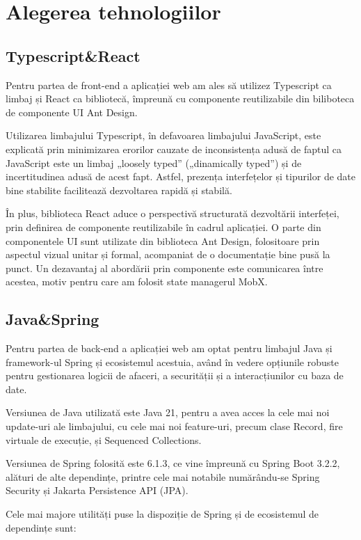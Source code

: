 \section{Alegerea tehnologiilor}

\subsection{Typescript\&React}

Pentru partea de front-end a aplicației web am ales să utilizez Typescript ca limbaj și React ca bibliotecă, împreună cu componente reutilizabile din biliboteca de componente UI Ant Design.

Utilizarea limbajului Typescript, în defavoarea limbajului JavaScript, este explicată prin minimizarea erorilor cauzate de inconsistența adusă de faptul ca JavaScript este un limbaj „loosely typed” („dinamically typed”) și de incertitudinea adusă de acest fapt. Astfel, prezența interfețelor și tipurilor de date bine stabilite facilitează dezvoltarea rapidă și stabilă.

În plus, biblioteca React aduce o perspectivă structurată dezvoltării interfeței, prin definirea de componente reutilizabile în cadrul aplicației. O parte din componentele UI sunt utilizate din biblioteca Ant Design, folositoare prin aspectul vizual unitar și formal, acompaniat de o documentație bine pusă la punct. Un dezavantaj al abordării prin componente este comunicarea între acestea, motiv pentru care am folosit state managerul MobX. 

\subsection{Java\&Spring}

Pentru partea de back-end a aplicației web am optat pentru limbajul Java și framework-ul Spring și ecosistemul acestuia, având în vedere opțiunile robuste pentru gestionarea logicii de afaceri, a securității și a interacțiunilor cu baza de date.

Versiunea de Java utilizată este Java 21, pentru a avea acces la cele mai noi update-uri ale limbajului, cu cele mai noi feature-uri, precum clase Record, fire virtuale de execuție, și Sequenced Collections. 

Versiunea de Spring folosită este 6.1.3, ce vine împreună cu Spring Boot 3.2.2, alături de alte dependințe, printre cele mai notabile numărându-se Spring Security și Jakarta Persistence API (JPA).

Cele mai majore utilități puse la dispoziție de Spring și de ecosistemul de dependințe sunt:


